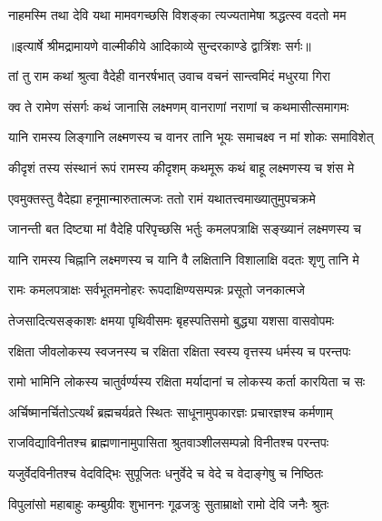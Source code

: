 \twolineshloka
{नाहमस्मि तथा देवि यथा मामवगच्छसि}
{विशङ्का त्यज्यतामेषा श्रद्धत्स्व वदतो मम} %


{॥इत्यार्षे श्रीमद्रामायणे वाल्मीकीये आदिकाव्ये सुन्दरकाण्डे द्वात्रिंशः सर्गः॥}


\twolineshloka
{तां तु राम कथां श्रुत्वा वैदेही वानरर्षभात्}
{उवाच वचनं सान्त्वमिदं मधुरया गिरा} %

\twolineshloka
{क्व ते रामेण संसर्गः कथं जानासि लक्ष्मणम्}
{वानराणां नराणां च कथमासीत्समागमः} %

\twolineshloka
{यानि रामस्य लिङ्गानि लक्ष्मणस्य च वानर}
{तानि भूयः समाचक्ष्व न मां शोकः समाविशेत्} %

\twolineshloka
{कीदृशं तस्य संस्थानं रूपं रामस्य कीदृशम्}
{कथमूरू कथं बाहू लक्ष्मणस्य च शंस मे} %

\twolineshloka
{एवमुक्तस्तु वैदेह्या हनूमान्मारुतात्मजः}
{ततो रामं यथातत्त्वमाख्यातुमुपचक्रमे} %

\twolineshloka
{जानन्ती बत दिष्ट्या मां वैदेहि परिपृच्छसि}
{भर्तुः कमलपत्राक्षि सङ्ख्यानं लक्ष्मणस्य च} %

\twolineshloka
{यानि रामस्य चिह्नानि लक्ष्मणस्य च यानि वै}
{लक्षितानि विशालाक्षि वदतः शृणु तानि मे} %

\twolineshloka
{रामः कमलपत्राक्षः सर्वभूतमनोहरः}
{रूपदाक्षिण्यसम्पन्नः प्रसूतो जनकात्मजे} %

\twolineshloka
{तेजसादित्यसङ्काशः क्षमया पृथिवीसमः}
{बृहस्पतिसमो बुद्ध्या यशसा वासवोपमः} %

\twolineshloka
{रक्षिता जीवलोकस्य स्वजनस्य च रक्षिता}
{रक्षिता स्वस्य वृत्तस्य धर्मस्य च परन्तपः} %

\twolineshloka
{रामो भामिनि लोकस्य चातुर्वर्ण्यस्य रक्षिता}
{मर्यादानां च लोकस्य कर्ता कारयिता च सः} %

\twolineshloka
{अर्चिष्मानर्चितोऽत्यर्थं ब्रह्मचर्यव्रते स्थितः}
{साधूनामुपकारज्ञः प्रचारज्ञश्च कर्मणाम्} %

\twolineshloka
{राजविद्याविनीतश्च ब्राह्मणानामुपासिता}
{श्रुतवाञ्शीलसम्पन्नो विनीतश्च परन्तपः} %

\twolineshloka
{यजुर्वेदविनीतश्च वेदविद्भिः सुपूजितः}
{धनुर्वेदे च वेदे च वेदाङ्गेषु च निष्ठितः} %

\twolineshloka
{विपुलांसो महाबाहुः कम्बुग्रीवः शुभाननः}
{गूढजत्रुः सुताम्राक्षो रामो देवि जनैः श्रुतः} %


